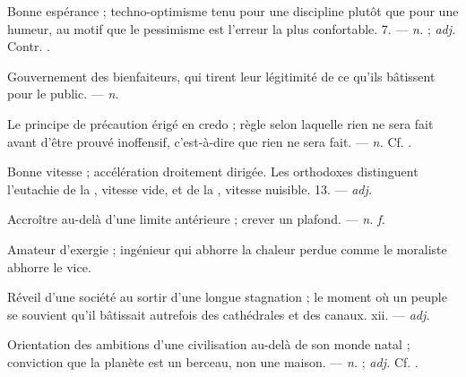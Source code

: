  Bonne espérance ; techno-optimisme tenu pour une discipline plutôt que pour une humeur, au motif que le pessimisme est l'erreur la plus confortable.   7. ---  \textit{n.} ;  \textit{adj.} Contr. .

 Gouvernement des bienfaiteurs, qui tirent leur légitimité de ce qu'ils bâtissent pour le public.  ---  \textit{n.}

 Le principe de précaution érigé en credo ; règle selon laquelle rien ne sera fait avant d'être prouvé inoffensif, c'est-à-dire que rien ne sera fait. ---  \textit{n.} Cf. .

 Bonne vitesse ; accélération droitement dirigée. Les orthodoxes distinguent l'eutachie de la , vitesse vide, et de la , vitesse nuisible.   13. ---  \textit{adj.}

 Accroître au-delà d'une limite antérieure ; crever un plafond.  ---  \textit{n. f.}

 Amateur d'exergie ; ingénieur qui abhorre la chaleur perdue comme le moraliste abhorre le vice.

 Réveil d'une société au sortir d'une longue stagnation ; le moment où un peuple se souvient qu'il bâtissait autrefois des cathédrales et des canaux.   xii. ---  \textit{adj.}

 Orientation des ambitions d'une civilisation au-delà de son monde natal ; conviction que la planète est un berceau, non une maison. ---  \textit{n.} ;  \textit{adj.} Cf. .

